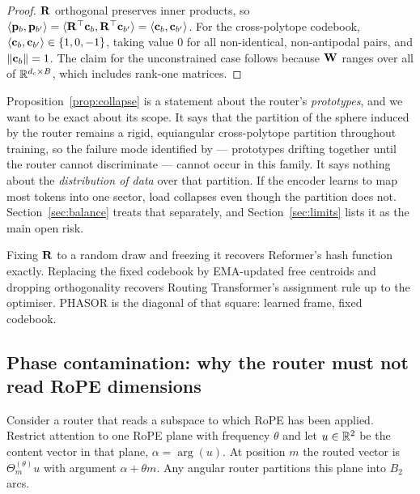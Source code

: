 \begin{proof}
$\mathbf{R}$ orthogonal preserves inner products, so $\langle \mathbf{p}_b, \mathbf{p}_{b'}\rangle = \langle \mathbf{R}^\top\mathbf{c}_b, \mathbf{R}^\top\mathbf{c}_{b'}\rangle = \langle \mathbf{c}_b, \mathbf{c}_{b'}\rangle$. For the cross-polytope codebook, $\langle \mathbf{c}_b,\mathbf{c}_{b'}\rangle \in \{1, 0, -1\}$, taking value $0$ for all non-identical, non-antipodal pairs, and $\|\mathbf{c}_b\| = 1$. The claim for the unconstrained case follows because $\mathbf{W}$ ranges over all of $\mathbb{R}^{d_{\mathrm{c}}\times B}$, which includes rank-one matrices.
\end{proof}

Proposition~\ref{prop:collapse} is a statement about the router's \emph{prototypes}, and we want to be exact about its scope. It says that the partition of the sphere induced by the router remains a rigid, equiangular cross-polytope partition throughout training, so the failure mode identified by \citet{chi2022representation} --- prototypes drifting together until the router cannot discriminate --- cannot occur in this family. It says nothing about the \emph{distribution of data} over that partition. If the encoder learns to map most tokens into one sector, load collapses even though the partition does not. Section~\ref{sec:balance} treats that separately, and Section~\ref{sec:limits} lists it as the main open risk.

\begin{remark}
Fixing $\mathbf{R}$ to a random draw and freezing it recovers Reformer's hash function exactly. Replacing the fixed codebook by EMA-updated free centroids and dropping orthogonality recovers Routing Transformer's assignment rule up to the optimiser. PHASOR is the diagonal of that square: learned frame, fixed codebook.
\end{remark}

\subsection{Phase contamination: why the router must not read RoPE dimensions}
\label{sec:rope}

Consider a router that reads a subspace to which RoPE has been applied. Restrict attention to one RoPE plane with frequency $\theta$ and let $u \in \mathbb{R}^2$ be the content vector in that plane, $\alpha = \arg(u)$. At position $m$ the routed vector is $\Theta^{(\theta)}_m u$ with argument $\alpha + \theta m$. Any angular router partitions this plane into $B_2$ arcs.

